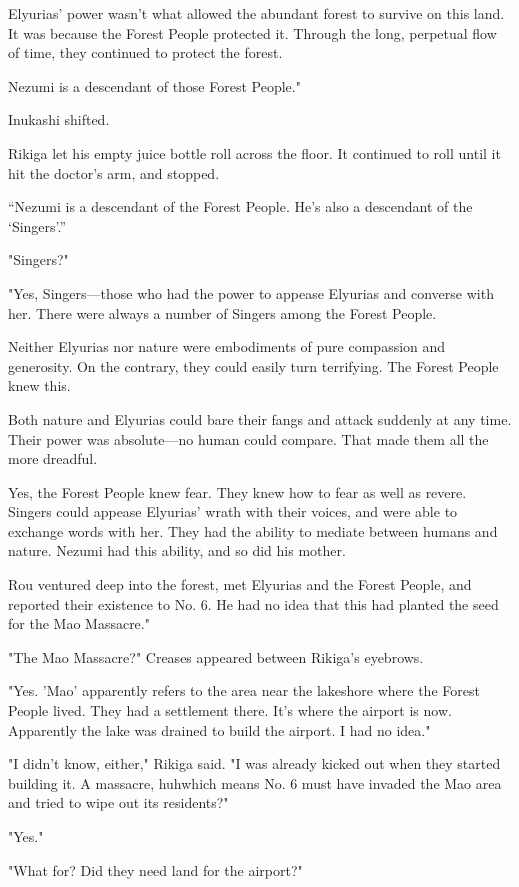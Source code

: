 Elyurias' power wasn't what allowed the abundant forest to survive on
this land. It was because the Forest People protected it. Through the
long, perpetual flow of time, they continued to protect the forest.

Nezumi is a descendant of those Forest People."

Inukashi shifted.

Rikiga let his empty juice bottle roll across the floor. It continued to
roll until it hit the doctor's arm, and stopped.

\enquote{Nezumi is a descendant of the Forest People. He's also a descendant of
the \enquote{Singers}.}

"Singers?"

"Yes, Singers---those who had the power to appease Elyurias and converse
with her. There were always a number of Singers among the Forest
People.

Neither Elyurias nor nature were embodiments of pure compassion and
generosity. On the contrary, they could easily turn terrifying. The
Forest People knew this.

Both nature and Elyurias could bare their fangs and attack suddenly at
any time. Their power was absolute---no human could compare. That made
them all the more dreadful.

Yes, the Forest People knew fear. They knew how to fear as well as
revere. Singers could appease Elyurias' wrath with their voices, and
were able to exchange words with her. They had the ability to mediate
between humans and nature. Nezumi had this ability, and so did his
mother.

Rou ventured deep into the forest, met Elyurias and the Forest People,
and reported their existence to No. 6. He had no idea that this had
planted the seed for the Mao Massacre."

"The Mao Massacre?" Creases appeared between Rikiga's eyebrows.

"Yes. 'Mao' apparently refers to the area near the lakeshore where the
Forest People lived. They had a settlement there. It's where the airport
is now. Apparently the lake was drained to build the airport. I had no
idea."

"I didn't know, either," Rikiga said. "I was already kicked out when
they started building it. A massacre, huh\el which means No. 6 must have
invaded the Mao area and tried to wipe out its residents?"

"Yes."

"What for? Did they need land for the airport?"

